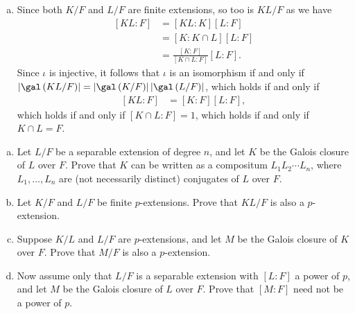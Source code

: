 \documentclass[10pt]{mypackage}
\begin{document}
\begin{solution}
\begin{enumerate}[(a)]
      We observe that $\sigma\in \ker\left( \iota \right)$ if and only if $\sigma|_{K} = \id_K$ and $\sigma|_{L} = \id_L$. Viewing $\sigma\in \operatorname{Emb}_F\left( KL, \overline{F} \right)$, we have that $\sigma$ fixes both $K$ and $L$. Yet, this means $\sigma$ must fix $KL$, so that $\iota$ is an embedding.
    \item Since both $K/F$ and $L/F$ are finite extensions, so too is $KL/F$ as we have
      \begin{align*}
        \left[ KL:F \right] &= \left[ KL:K \right]\left[ L:F \right]\\
                            &= \left[ K:K\cap L \right]\left[ L:F \right]\\
                            &= \frac{\left[ K:F \right]}{\left[ K\cap L:F \right]}\left[ L:F \right].
      \end{align*}
      Since $\iota$ is injective, it follows that $\iota$ is an isomorphism if and only if $\left\vert \gal\left( KL/F \right) \right\vert = \left\vert \gal\left( K/F \right) \right\vert\left\vert \gal\left( L/F \right) \right\vert$, which holds if and only if
      \begin{align*}
        \left[ KL:F \right] &= \left[ K:F \right]\left[ L:F \right],
      \end{align*}
      which holds if and only if $\left[ K\cap L:F \right] = 1$, which holds if and only if $K\cap L = F$.
  \end{enumerate}
\end{solution}
\begin{problem}[Problem 5]\hfill
  \begin{enumerate}[(a)]
    \item Let $L/F$ be a separable extension of degree $n$, and let $K$ be the Galois closure of $L$ over $F$. Prove that $K$ can be written as a compositum $L_1L_2\cdots L_n$, where $L_1,\dots,L_n$ are (not necessarily distinct) conjugates of $L$ over $F$.
    \item Let $K/F$ and $L/F$ be finite $p$-extensions. Prove that $KL/F$ is also a $p$-extension.
    \item Suppose $K/L$ and $L/F$ are $p$-extensions, and let $M$ be the Galois closure of $K$ over $F$. Prove that $M/F$ is also a $p$-extension.
    \item Now assume only that $L/F$ is a separable extension with $\left[ L:F \right]$ a power of $p$, and let $M$ be the Galois closure of $L$ over $F$. Prove that $\left[ M:F \right]$ need not be a power of $p$.
  \end{enumerate}
\end{problem}
\end{document}
